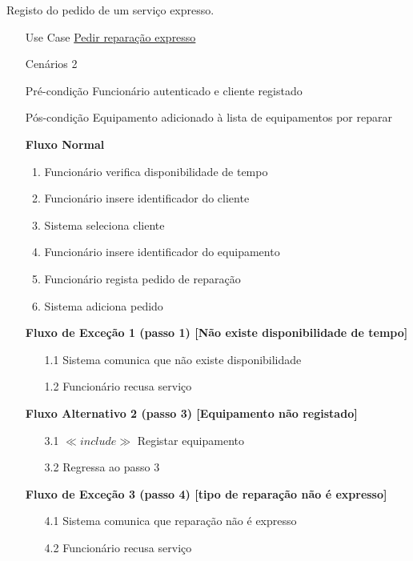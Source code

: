 \documentclass[../relatorio.tex]{subfiles}
\begin{document}
Registo do pedido de um serviço expresso.
\begin{itemize}
    \item[Use Case] {\underline{Pedir reparação expresso}}
    \item[Cenários] {2}
    \item[Pré-condição] {Funcionário autenticado e cliente registado}
    \item[Pós-condição] {Equipamento adicionado à lista de equipamentos por reparar}
          \begin{flushleft}
              \textbf{Fluxo Normal}
          \end{flushleft}
          \begin{enumerate}
              \item Funcionário verifica disponibilidade de tempo
              \item Funcionário insere identificador do cliente
              \item Sistema seleciona cliente
              \item Funcionário insere identificador do equipamento
              \item Funcionário regista pedido de reparação
              \item Sistema adiciona pedido
          \end{enumerate}

          \begin{flushleft}
              \textbf{Fluxo de Exceção 1 (passo 1) [Não existe disponibilidade de tempo]}
          \end{flushleft}
          \begin{itemize}
              \item[1.1]{Sistema comunica que não existe disponibilidade}
              \item[1.2]{Funcionário recusa serviço}
          \end{itemize}
          \begin{flushleft}
              \textbf{Fluxo Alternativo 2 (passo 3) [Equipamento não registado]}
          \end{flushleft}
          \begin{itemize}
              \item[3.1] $\ll include \gg$ Registar equipamento
              \item[3.2] Regressa ao passo 3
          \end{itemize}
          \begin{flushleft}
              \textbf{Fluxo de Exceção 3 (passo 4) [tipo de reparação não é expresso]}
          \end{flushleft}
          \begin{itemize}
              \item[4.1]{Sistema comunica que reparação não é expresso}
              \item[4.2]{Funcionário recusa serviço}
          \end{itemize}
\end{itemize}
\end{document}
